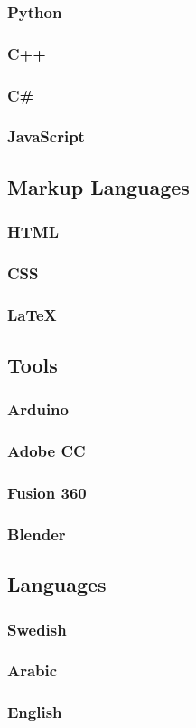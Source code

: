 \documentclass{article}
\begin{document}
\begin{multicols}{2}
        \subsubsection{Python}
        \subsubsection{C++}
        \subsubsection{C\#}
        \subsubsection{JavaScript}
        \subsection{Markup Languages}
            \subsubsection{HTML}
            \subsubsection{CSS}
            \subsubsection{LaTeX}
        \subsection{Tools}
            \subsubsection{Arduino}
            \subsubsection{Adobe CC}
            \subsubsection{Fusion 360}
            \subsubsection{Blender}
        \subsection{Languages}
            \subsubsection{Swedish}
            \subsubsection{Arabic}
            \subsubsection{English}
    \end{multicols}
\end{document}
